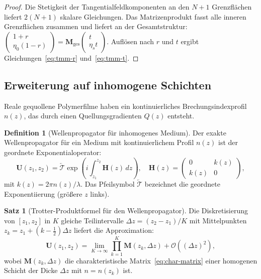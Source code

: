 ﻿\documentclass[a4paper,12pt]{article}
\theoremstyle{definition}
\newtheorem{definition}{Definition}[section]
\newtheorem{satz}{Satz}[section]
\newcommand{\ordre}[1]{\mathcal{O}\!\left(#1\right)}
\newcommand{\matr}[1]{\mathbf{#1}}
\begin{document}
	\begin{proof}
		Die Stetigkeit der Tangentialfeldkomponenten an den $N+1$ Grenzflächen liefert
		$2(N+1)$ skalare Gleichungen. Das Matrizenprodukt fasst alle inneren
		Grenzflächen zusammen und liefert an der Gesamtstruktur:
		$\begin{pmatrix}1 + r\\ \eta_0(1-r)\end{pmatrix}
		= \matr{M}_\mathrm{ges}\begin{pmatrix}t\\ \eta_s t\end{pmatrix}$.
		Auflösen nach $r$ und $t$ ergibt Gleichungen~\eqref{eq:tmm-r}
		und~\eqref{eq:tmm-t}.
	\end{proof}
	
	\subsection{Erweiterung auf inhomogene Schichten}
	\label{ssec:tmm-inhomogen}
	
	Reale gequollene Polymerfilme haben ein kontinuierliches Brechungsindexprofil
	$n(z)$, das durch einen Quellungsgradienten $Q(z)$ entsteht.
	
	\begin{definition}[Wellenpropagator für inhomogenes Medium]
		\label{def:wellenpropagator}
		Der exakte Wellenpropagator für ein Medium mit kontinuierlichem Profil $n(z)$
		ist der geordnete Exponentialoperator:
		\begin{equation}
			\matr{U}(z_1, z_2) = \overleftarrow{\mathcal{T}} \exp\!\left(
			i \int_{z_1}^{z_2} \matr{H}(z)\, dz
			\right), \quad
			\matr{H}(z) = \begin{pmatrix} 0 & k(z) \\ k(z) & 0 \end{pmatrix},
			\label{eq:wellenpropagator}
		\end{equation}
		mit $k(z) = 2\pi n(z)/\lambda$. Das Pfeilsymbol $\overleftarrow{\mathcal{T}}$
		bezeichnet die geordnete Exponentiierung (größere $z$ links).
	\end{definition}
	
	\begin{satz}[Trotter-Produktformel für den Wellenpropagator]
		\label{satz:trotter}
		Die Diskretisierung von $[z_1, z_2]$ in $K$ gleiche Teilintervalle
		$\Delta z = (z_2-z_1)/K$ mit Mittelpunkten $z_k = z_1 + (k-\tfrac{1}{2})\Delta z$
		liefert die Approximation:
		\begin{equation}
			\matr{U}(z_1, z_2) = \lim_{K\to\infty} \prod_{k=1}^{K} \matr{M}(z_k, \Delta z)
			+ \ordre{(\Delta z)^2},
			\label{eq:trotter}
		\end{equation}
		wobei $\matr{M}(z_k, \Delta z)$ die charakteristische Matrix~\eqref{eq:char-matrix}
		einer homogenen Schicht der Dicke $\Delta z$ mit $n = n(z_k)$ ist.
	\end{satz}
	
\end{document}
